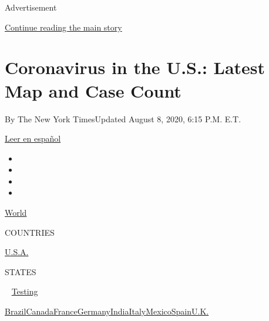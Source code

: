 Advertisement

\protect\hyperlink{after-top}{Continue reading the main story}

\hypertarget{coronavirus-in-the-us-latest-map-and-case-count}{%
\section{Coronavirus in the U.S.: Latest Map and Case
Count}\label{coronavirus-in-the-us-latest-map-and-case-count}}

By The New York TimesUpdated August 8, 2020, 6:15 P.M. E.T.

\href{https://www.nytimes.com/es/interactive/2020/espanol/mundo/coronavirus-en-estados-unidos.html}{Leer
en español}

\begin{itemize}
\item
\item
\item
\item
\end{itemize}

\href{https://www.nytimes.com/interactive/2020/world/coronavirus-maps.html}{World}~

COUNTRIES

\textbar{}
\href{https://www.nytimes.com/interactive/2020/us/coronavirus-us-cases.html}{U.S.A.}~

STATES

~
\href{https://www.nytimes.com/interactive/2020/us/coronavirus-testing.html}{Testing}

\href{https://www.nytimes.com/interactive/2020/world/americas/brazil-coronavirus-cases.html}{Brazil}\href{https://www.nytimes.com/interactive/2020/world/canada/canada-coronavirus-cases.html}{Canada}\href{https://www.nytimes.com/interactive/2020/world/europe/france-coronavirus-cases.html}{France}\href{https://www.nytimes.com/interactive/2020/world/europe/germany-coronavirus-cases.html}{Germany}\href{https://www.nytimes.com/interactive/2020/world/asia/india-coronavirus-cases.html}{India}\href{https://www.nytimes.com/interactive/2020/world/europe/italy-coronavirus-cases.html}{Italy}\href{https://www.nytimes.com/interactive/2020/world/americas/mexico-coronavirus-cases.html}{Mexico}\href{https://www.nytimes.com/interactive/2020/world/europe/spain-coronavirus-cases.html}{Spain}\href{https://www.nytimes.com/interactive/2020/world/europe/united-kingdom-coronavirus-cases.html}{U.K.}

